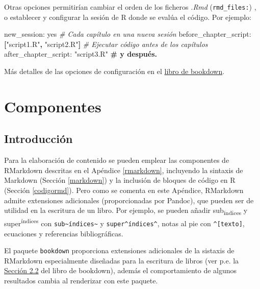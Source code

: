 \documentclass[]{book}
\newenvironment{Shaded}{\begin{snugshade}}{\end{snugshade}}
\newcommand{\KeywordTok}[1]{\textcolor[rgb]{0.13,0.29,0.53}{\textbf{#1}}}
\newcommand{\StringTok}[1]{\textcolor[rgb]{0.31,0.60,0.02}{#1}}
\newcommand{\CommentTok}[1]{\textcolor[rgb]{0.56,0.35,0.01}{\textit{#1}}}
\newcommand{\FunctionTok}[1]{\textcolor[rgb]{0.00,0.00,0.00}{#1}}
\newcommand{\AttributeTok}[1]{\textcolor[rgb]{0.77,0.63,0.00}{#1}}
\newcommand{\ErrorTok}[1]{\textcolor[rgb]{0.64,0.00,0.00}{\textbf{#1}}}
\theoremstyle{definition}
\theoremstyle{definition}
\theoremstyle{definition}
\theoremstyle{remark}
\begin{document}
Otras opciones permitirían cambiar el orden de los ficheros \emph{.Rmd}
(\texttt{rmd\_files:}) , o establecer y configurar la sesión de R donde
se evalúa el código. Por ejemplo:

\begin{Shaded}
\begin{Highlighting}[]
\FunctionTok{new_session:}\AttributeTok{ yes                                    }\CommentTok{# Cada capítulo en una nueva sesión}
\FunctionTok{before_chapter_script:}\AttributeTok{ }\KeywordTok{[}\StringTok{"script1.R"}\KeywordTok{,} \StringTok{"script2.R"}\KeywordTok{]}\AttributeTok{   }\CommentTok{# Ejecutar código antes de los capítulos}
\FunctionTok{after_chapter_script:}\AttributeTok{ }\StringTok{"script3.R"}\ErrorTok{                   # y después.}
\end{Highlighting}
\end{Shaded}

Más detalles de las opciones de configuración en el
\href{https://bookdown.org/yihui/bookdown/configuration.html\#configuration}{libro
de bookdown}.

\chapter{Componentes}\label{componentes}

\section{Introducción}\label{introduccion}

Para la elaboración de contenido se pueden emplear las componentes de
RMarkdown descritas en el Apéndice \ref{rmarkdown}, incluyendo la
sintaxis de Markdown (Sección \ref{markdown}) y la inclusión de bloques
de código en R (Sección \ref{codigormd}). Pero como se comenta en este
Apéndice, RMarkdown admite extensiones adicionales (proporcionadas por
Pandoc), que pueden ser de utilidad en la escritura de un libro. Por
ejemplo, se pueden añadir sub\textsubscript{índices} y
super\textsuperscript{índices} con
\texttt{sub\textasciitilde{}índices\textasciitilde{}} y
\texttt{super\^{}índices\^{}}, notas al pie con
\texttt{\^{}{[}texto{]}}, ecuaciones y referencias bibliográficas.

El paquete \texttt{bookdown} proporciona extensiones adicionales de la
sistaxis de RMarkdown especialmente diseñadas para la escritura de
libros (ver p.e. la
\href{https://bookdown.org/yihui/bookdown/markdown-extensions-by-bookdown.html}{Sección
2.2} del libro de bookdown), además el comportamiento de algunos
resultados cambia al renderizar con este paquete.
\end{document}
